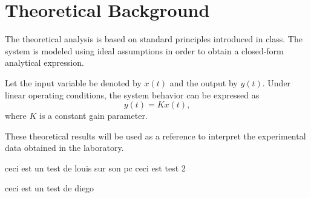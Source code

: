 \section{Theoretical Background}
\label{sec:theory}

The theoretical analysis is based on standard principles introduced in class.
The system is modeled using ideal assumptions in order to obtain a closed-form
analytical expression.

Let the input variable be denoted by $x(t)$ and the output by $y(t)$. Under linear
operating conditions, the system behavior can be expressed as
\[
y(t) = K x(t),
\]
where $K$ is a constant gain parameter.

These theoretical results will be used as a reference to interpret the experimental
data obtained in the laboratory.

ceci est un test de louis sur son pc
ceci est test 2

ceci est un test de diego
